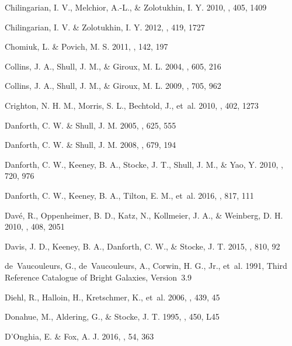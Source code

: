 \documentclass[twocolumn,twocolappendix,tighten,times]{aastex6}
\begin{document}
\begin{thebibliography}
 Chilingarian, I. V., Melchior, A.-L., \& Zolotukhin, I. Y. 2010, \mnras, 405, 1409

 Chilingarian, I. V. \& Zolotukhin, I. Y. 2012, \mnras, 419, 1727

 Chomiuk, L. \& Povich, M. S. 2011, \aj, 142, 197

 Collins, J. A., Shull, J. M., \& Giroux, M. L. 2004, \apj, 605, 216

 Collins, J. A., Shull, J. M., \& Giroux, M. L. 2009, \apj, 705, 962

 Crighton, N. H. M., Morris, S. L., Bechtold, J., et~al. 2010, \mnras, 402, 1273

 Danforth, C. W. \& Shull, J. M. 2005, \apj, 625, 555

 Danforth, C. W. \& Shull, J. M. 2008, \apj, 679, 194

 Danforth, C. W., Keeney, B. A., Stocke, J. T., Shull, J. M., \& Yao, Y. 2010, \apj, 720, 976

 Danforth, C. W., Keeney, B. A., Tilton, E. M., et~al. 2016, \apj, 817, 111

 Dav\'e, R., Oppenheimer, B. D., Katz, N., Kollmeier, J. A., \& Weinberg, D. H. 2010, \mnras, 408, 2051

 Davis, J. D., Keeney, B. A., Danforth, C. W., \& Stocke, J. T. 2015, \apj, 810, 92

 de~Vaucouleurs, G., de~Vaucouleurs, A., Corwin, H. G., Jr., et~al. 1991, Third Reference Catalogue of Bright Galaxies, Version~3.9

 Diehl, R., Halloin, H., Kretschmer, K., et~al. 2006, \nat, 439, 45

 Donahue, M., Aldering, G., \& Stocke, J. T. 1995, \apj, 450, L45

 D'Onghia, E. \& Fox, A. J. 2016, \araa, 54, 363


\end{thebibliography}
\end{document}
